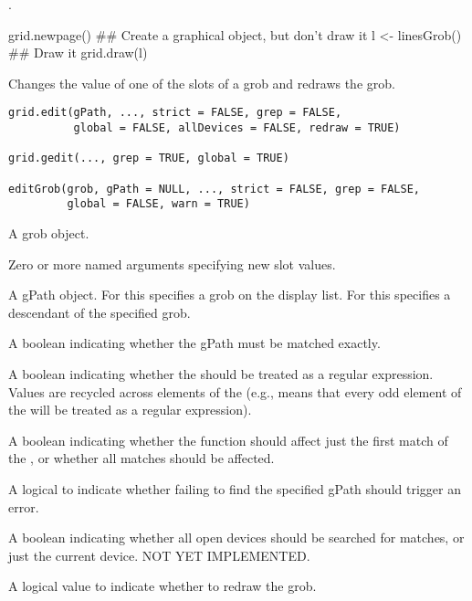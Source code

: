 %
\begin{SeeAlso}\relax
{}.
\end{SeeAlso}
%
\begin{Examples}
\begin{ExampleCode}
grid.newpage()
## Create a graphical object, but don't draw it
l <- linesGrob()
## Draw it
grid.draw(l)
\end{ExampleCode}
\end{Examples}
%
\begin{Description}\relax
Changes the value of one of the slots of a grob
and redraws the grob.
\end{Description}
%
\begin{Usage}
\begin{verbatim}
grid.edit(gPath, ..., strict = FALSE, grep = FALSE,
          global = FALSE, allDevices = FALSE, redraw = TRUE)

grid.gedit(..., grep = TRUE, global = TRUE)

editGrob(grob, gPath = NULL, ..., strict = FALSE, grep = FALSE,
         global = FALSE, warn = TRUE) 
\end{verbatim}
\end{Usage}
%
\begin{Arguments}
\begin{ldescription}
\item[\code{grob}] A grob object.
\item[\code{...}] Zero or more named arguments specifying new slot values.
\item[\code{gPath}]  A gPath object. For  this
specifies a grob on the display list.  For  this
specifies a descendant of the specified grob. 
\item[\code{strict}]  A boolean indicating whether the gPath must be
matched exactly. 
\item[\code{grep}] A boolean indicating whether the  should
be treated as a regular expression.  Values are recycled across
elements of the  (e.g.,  means
that every odd element of the  will be treated as
a regular expression).

\item[\code{global}]  A boolean indicating whether the function should affect
just the first match of the , or whether all matches
should be affected.

\item[\code{warn}] A logical to indicate whether failing to find the
specified gPath should trigger an error.  
\item[\code{allDevices}]  A boolean indicating whether all open devices
should
be searched for matches, or just the current device.
NOT YET IMPLEMENTED.

\item[\code{redraw}] A logical value to indicate whether to redraw the grob. 
\end{ldescription}
\end{Arguments}
